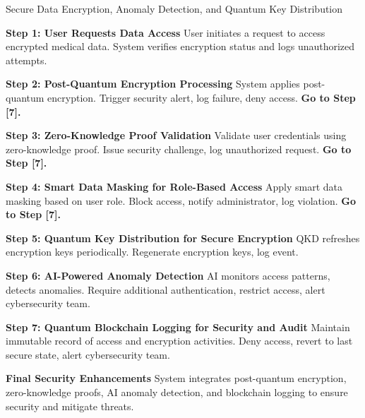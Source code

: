 \documentclass[pdflatex,sn-mathphys-num]{sn-jnl}%
\theoremstyle{thmstyleone}%
\theoremstyle{thmstyletwo}%
\theoremstyle{thmstylethree}%
\begin{document}

\begin{algorithm}[h!]
\caption{Secure Data Encryption, Anomaly Detection, and Quantum Key Distribution}
\begin{algorithmic}[1]

\STATE \textbf{Step 1: User Requests Data Access}
\STATE User initiates a request to access encrypted medical data.
\STATE System verifies encryption status and logs unauthorized attempts.

\STATE \textbf{Step 2: Post-Quantum Encryption Processing}
\STATE System applies post-quantum encryption.
    \STATE Trigger security alert, log failure, deny access. \textbf{Go to Step [7].}
\ENDIF

\STATE \textbf{Step 3: Zero-Knowledge Proof Validation}
\STATE Validate user credentials using zero-knowledge proof.
    \STATE Issue security challenge, log unauthorized request. \textbf{Go to Step [7].}
\ENDIF

\STATE \textbf{Step 4: Smart Data Masking for Role-Based Access}
\STATE Apply smart data masking based on user role.
    \STATE Block access, notify administrator, log violation. \textbf{Go to Step [7].}
\ENDIF

\STATE \textbf{Step 5: Quantum Key Distribution for Secure Encryption}
\STATE QKD refreshes encryption keys periodically.
    \STATE Regenerate encryption keys, log event.
\ENDIF

\STATE \textbf{Step 6: AI-Powered Anomaly Detection}
\STATE AI monitors access patterns, detects anomalies.
    \STATE Require additional authentication, restrict access, alert cybersecurity team.
\ENDIF


\STATE \textbf{Step 7: Quantum Blockchain Logging for Security and Audit}
\STATE Maintain immutable record of access and encryption activities.
    \STATE Deny access, revert to last secure state, alert cybersecurity team.
\ENDIF

\STATE \textbf{Final Security Enhancements}
\STATE System integrates post-quantum encryption, zero-knowledge proofs, AI anomaly detection, and blockchain logging to ensure security and mitigate threats.

\end{algorithmic}
\end{algorithm}
\end{document}
